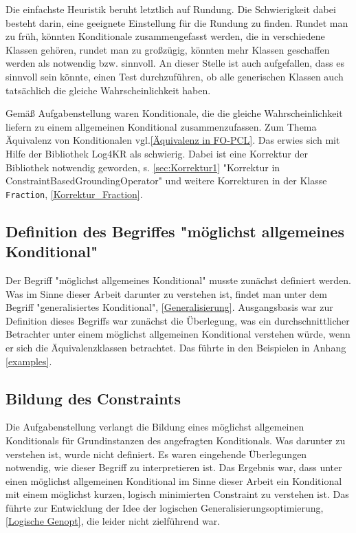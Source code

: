 \documentclass[a4paper, 11pt]{book}
\begin{document}
{Die einfachste Heuristik beruht letztlich auf Rundung. Die Schwierigkeit dabei besteht darin, eine geeignete Einstellung für die Rundung zu finden. Rundet man zu früh, könnten Konditionale zusammengefasst werden, die in verschiedene Klassen gehören, rundet man zu großzügig, könnten mehr Klassen geschaffen werden als notwendig bzw. sinnvoll.
An dieser Stelle ist auch aufgefallen, dass es sinnvoll sein könnte, einen Test durchzuführen, ob alle generischen Klassen auch tatsächlich die gleiche Wahrscheinlichkeit haben. 

Gemäß Aufgabenstellung waren Konditionale, die die gleiche Wahrscheinlichkeit liefern zu einem allgemeinen Konditional zusammenzufassen. Zum Thema Äquivalenz von Konditionalen vgl.\ref{Äquivalenz in FO-PCL}.
Das erwies sich mit Hilfe der Bibliothek Log4KR als schwierig. Dabei ist eine Korrektur der Bibliothek notwendig geworden, s. \ref{sec:Korrektur1} "{}Korrektur in ConstraintBasedGroundingOperator"{} und weitere Korrekturen in der Klasse \texttt{Fraction}, \ref{Korrektur_Fraction}.


\subsection{Definition des Begriffes "{}möglichst allgemeines Konditional"{} }
Der Begriff  "{}möglichst allgemeines Konditional"{} musste zunächst definiert werden. Was im Sinne dieser Arbeit darunter zu verstehen ist, findet man unter dem Begriff "{}generalisiertes Konditional"{}, \ref{Generalisierung}. Ausgangsbasis war zur Definition dieses Begriffs war zunächst die Überlegung, was ein durchschnittlicher Betrachter unter einem möglichst allgemeinen Konditional verstehen würde, wenn er sich die Äquivalenzklassen betrachtet. Das führte in den Beispielen in Anhang \ref{examples}. 

\subsection{Bildung des Constraints}
Die Aufgabenstellung verlangt die Bildung eines möglichst allgemeinen Konditionals für Grundinstanzen des angefragten Konditionals. Was darunter zu verstehen ist, wurde nicht definiert. Es waren eingehende Überlegungen notwendig, wie dieser Begriff zu interpretieren ist. Das Ergebnis war, dass unter einen möglichst allgemeinen Konditional im Sinne dieser Arbeit ein Konditional mit einem möglichst kurzen, logisch minimierten Constraint zu verstehen ist. Das führte zur Entwicklung der Idee der logischen Generalisierungsoptimierung, \ref{Logische Genopt}, die leider nicht zielführend war. 

}
\end{document}
